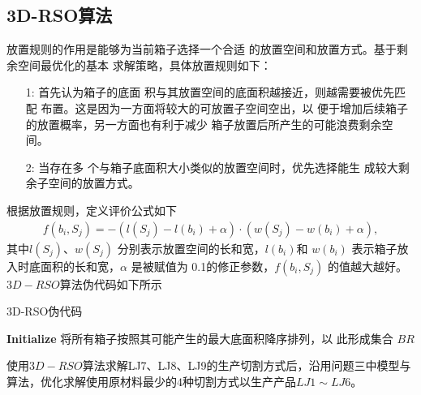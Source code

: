 \documentclass{whutmod}
\begin{document}
  	\subsection{3D-RSO算法}
  	放置规则的作用是能够为当前箱子选择一个合适
  	的放置空间和放置方式。基于剩余空间最优化的基本
  	求解策略，具体放置规则如下：
  		\begin{itemize}
  		\item[1:]	首先认为箱子的底面
  		积与其放置空间的底面积越接近，则越需要被优先匹配
  		布置。这是因为一方面将较大的可放置子空间空出，以
  		便于增加后续箱子的放置概率，另一方面也有利于减少
  		箱子放置后所产生的可能浪费剩余空间。
  		\item[2:]	当存在多
  		个与箱子底面积大小类似的放置空间时，优先选择能生
  		成较大剩余子空间的放置方式。
  	\end{itemize}
   根据放置规则，定义评价公式如下
   \begin{gather*}
  f(b_i,S_j)=-(l(S_j)-l(b_i)+\alpha )\cdot(w(S_j)-w(b_i)+\alpha ),
   \end{gather*}
  其中$l(S_j)$、$w(S_j)$ 分别表示放置空间的长和宽，$l(b_i)$和
  $w(b_i)$ 表示箱子放入时底面积的长和宽，$\alpha$ 是被赋值为
  0.1的修正参数，$f (b_i ,S_j)$ 的值越大越好。$3D-RSO$算法伪代码如下所示
  
 \begin{algorithm}[H]
 	\caption{3D-RSO伪代码}  
 	\LinesNumbered  
 	\textbf{Initialize} \newline
 	将所有箱子按照其可能产生的最大底面积降序排列，以
 	此形成集合 $BR$\newline
 \end{algorithm} 
 使用$3D-RSO$算法求解LJ7、LJ8、LJ9的生产切割方式后，沿用问题三中模型与算法，优化求解使用原材料最少的$4$种切割方式以生产产品$LJ1\sim LJ6$。
  	
\end{document}
